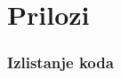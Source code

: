 \newpage

\section*{Prilozi} %
\label{sec:Prilozi}

\subsubsection*{Izlistanje koda} %
\label{ssub:Izlistanje koda}


